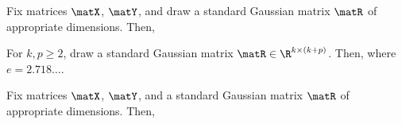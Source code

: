 \begin{lemma}  \label{prop1b}
Fix matrices $\matX$, $\matY$, and draw a standard Gaussian matrix $\matR$ of appropriate dimensions. Then,
\end{lemma}
\begin{lemma}  \label{prop2b}
For $k, p \geq 2$, draw a standard Gaussian matrix $\matR \in \R^{k \times (k+p)}$. Then,
where $e=2.718\ldots$.
\end{lemma}

\begin{lemma}  \label{prop1a}
Fix matrices $\matX$, $\matY$, and a standard Gaussian matrix $\matR$ of appropriate dimensions. Then,
\end{lemma}

